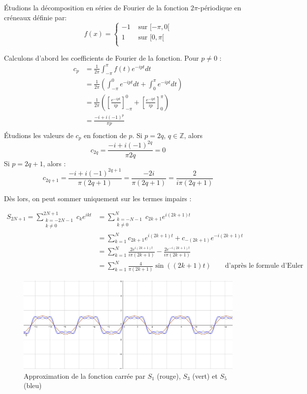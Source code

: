 	\begin{myexmpl}
		Étudions la décomposition en séries de Fourier de la fonction $2\pi$-périodique en créneaux définie par: 
		$$ f(x) = \left\{
		\begin{array}{cc}
			-1 & \text{ sur }[-\pi, 0[ \\
			1 & \text{ sur }[0, \pi[ \\
		\end{array}
		\right. $$
	
	Calculons d'abord les coefficients de Fourier de la fonction. 
	Pour $p \neq 0$ : 
	\begin{align*}
	c_p &= \frac{1}{2\pi} \int_{-\pi}^{\pi}f(t)e^{-ipt}dt\\
		&= \frac{1}{2\pi} \left(\int_{-\pi}^{0}e^{-ipt}dt + \int_{0}^{\pi}e^{-i pt}dt\right) \\
		&= \frac{1}{2\pi} \left( \left[\frac{e^{-ipt}}{ip}\right]_{-\pi}^{0}  + \left[\frac{e^{-ipt}}{ip}\right] _{0}^{\pi}  \right)\\
		&=\frac{ -i+i(-1)^p}{\pi p}\\
	\end{align*}
	Étudions les valeurs de $c_p$ en fonction de $p$. Si $p = 2q$, $q \in \mathbb{Z}$, alors 
	$$	c_{2q}= \frac{-i + i(-1)^{2q}}{\pi 2q }= 0 $$
	Si $ p = 2q+1$, alors :
	$$ c_{2q+1} = \frac{-i + i(-1)^{2q+1}}{\pi (2q+1) } = \frac{-2i}{\pi(2q+1)} = \frac{2}{i\pi(2q+1)} $$
	
	Dès lors, on peut sommer uniquement sur les termes impairs : 
	
	\begin{align*}
	S_{2N+1} = \sum_{ \substack{ k = -2N-1\\ k\neq 0} }^{2N+1}c_k e^{ikt} &=   \sum_{\substack{k = -N-1\\k\neq 0}}^{N}c_{2k+1} e^{i(2k+1)t} \\
	&= \sum_{k=1}^{N} c_{2k+1} e^{i(2k+1)t} + c_{-(2k+1)} e^{-i(2k+1)t} \\
	&= \sum_{k=1}^{N} \frac{2e^{i(2k+1)t}}{i\pi (2k+1)} - \frac{2e^{-i(2k+1)t}}{i\pi (2k+1)} \\
	&= \sum_{k=1}^{N} \frac{4}{\pi (2k+1)} \sin((2k+1)t)  \qquad\text{d'après le formule d'Euler}
	\end{align*}
	
	\begin{figure}[h]
		\centering
		\includegraphics[width=350pt]{Chloe/Signal_carre_fourier.png}
		\caption{Approximation de la fonction carrée par $S_1$ (rouge), $S_3$ (vert) et $S_5$ (bleu)}
	\end{figure}
	
	\end{myexmpl}
	\newpage
